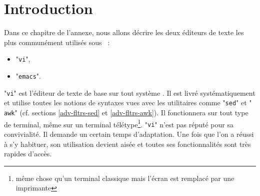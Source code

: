 %
%

\section{Introduction}

Dans ce chapitre de l'annexe, nous allons d{\'e}crire les deux {\'e}diteurs de texte
les plus commun{\'e}ment utilis{\'e}s sous {\Unix}~:
\begin{itemize}
	\item	{}"{\tt vi}",
	\item	{}"{\tt emacs}".
\end{itemize}

"{\tt vi}" est l'{\'e}diteur de texte de base sur tout syst{\`e}me
{\Unix}. Il est livr{\'e} syst{\'e}matiquement et utilise toutes les notions de
syntaxes vues avec les utilitaires comme "{\tt sed}" et "{\tt
awk}" (cf. sections \ref{adv-fltrs-sed} et \ref{adv-fltrs-awk}). Il
fonctionnera sur tout type de terminal, m{\^e}me sur un terminal
t{\'e}l{\'e}type\footnote{m{\^e}me chose qu'un terminal {\ASCII} classique mais l'{\'e}cran
est remplac{\'e} par une imprimante}. "{\tt vi}" n'est pas r{\'e}put{\'e} pour
sa convivialit{\'e}. Il demande un certain temps d'adaptation. Une fois que
l'on a r{\'e}ussi {\`a} s'y habituer, son utilisation devient ais{\'e}e et toutes
ses fonctionnalit{\'e}s sont tr{\`e}s rapides d'acc{\`e}s.

